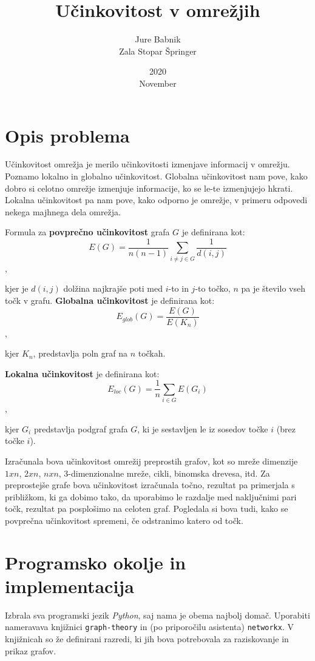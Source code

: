 \documentclass[a4paper, 16pt]{article}
\title{Učinkovitost v omrežjih}
\date{2020\\ November}
\author{Jure Babnik \\  Zala Stopar Špringer}
\begin{document}
\maketitle

\section{Opis problema}

Učinkovitost omrežja je merilo učinkovitosti izmenjave informacij v omrežju. Poznamo lokalno in globalno učinkovitost. Globalna učinkovitost nam pove, kako dobro si celotno omrežje
izmenjuje informacije, ko se le-te izmenjujejo hkrati. Lokalna učinkovitost pa nam pove, kako odporno je omrežje, v primeru odpovedi nekega majhnega dela omrežja.\n

Formula za \textbf{povprečno učinkovitost} grafa $G$ je definirana kot:
$$ E(G) = \frac{1}{n(n-1)} \sum_{i\neq j \in G} \frac{1}{d(i,j)}$$,

kjer je $d(i,j)$ dolžina najkrajše poti med $i$-to in $j$-to točko, $n$ pa je število vseh točk v grafu.\n
\textbf{Globalna učinkovitost} je definirana kot:
$$ E_{glob}(G) = \frac{E(G)}{E(K_n)} $$,

kjer $K_n$, predstavlja poln graf na $n$ točkah.

\textbf{Lokalna učinkovitost} je definirana kot:
$$ E_{loc}(G) = \frac{1}{n} \sum_{i \in G} E(G_i) $$,

kjer $G_i$ predstavlja podgraf grafa $G$, ki je sestavljen le iz sosedov točke $i$ (brez točke $i$).\n

Izračunala bova učinkovitost omrežij preprostih grafov, kot so mreže dimenzije $1 x n$, $2 x n$, $n x n$, 3-dimenzionalne mreže, cikli, binomska drevesa, itd.
Za preprostejše grafe bova učinkovitost izračunala točno, rezultat pa primerjala s približkom, ki ga dobimo tako, da uporabimo le razdalje med naključnimi pari točk, 
rezultat pa posplošimo na celoten graf. Pogledala si bova tudi, kako se povprečna učinkovitost spremeni, če odstranimo katero od točk. 

\section{Programsko okolje in implementacija}

Izbrala sva programski jezik \emph{Python}, saj nama je obema najbolj domač. Uporabiti nameravava knjižnici \texttt{graph-theory} in (po priporočilu asistenta) \texttt{networkx}.
V knjižnicah so že definirani razredi, ki jih bova potrebovala za raziskovanje in prikaz grafov. 
\end{document}

